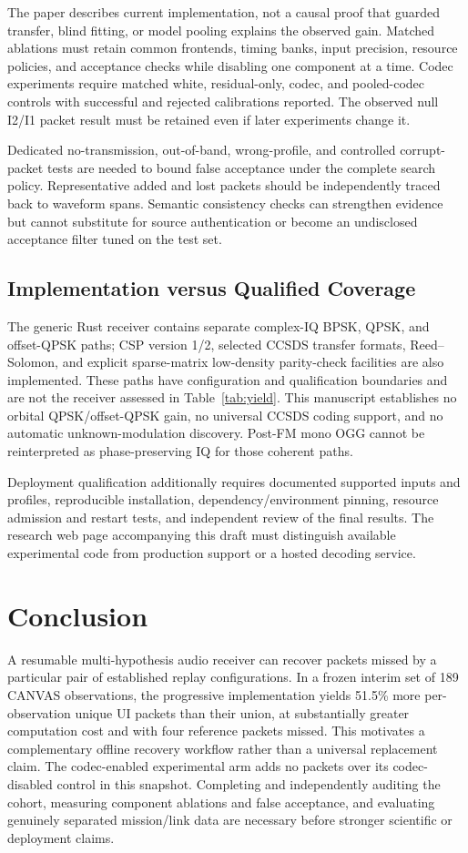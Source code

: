 \documentclass{ieeeaccess}
\begin{document}
The paper describes current implementation, not a causal proof that guarded transfer, blind fitting, or model pooling explains the observed gain. Matched ablations must retain common frontends, timing banks, input precision, resource policies, and acceptance checks while disabling one component at a time. Codec experiments require matched white, residual-only, codec, and pooled-codec controls with successful and rejected calibrations reported. The observed null I2/I1 packet result must be retained even if later experiments change it.

Dedicated no-transmission, out-of-band, wrong-profile, and controlled corrupt-packet tests are needed to bound false acceptance under the complete search policy. Representative added and lost packets should be independently traced back to waveform spans. Semantic consistency checks can strengthen evidence but cannot substitute for source authentication or become an undisclosed acceptance filter tuned on the test set.

\subsection{Implementation versus Qualified Coverage}
The generic Rust receiver contains separate complex-IQ BPSK, QPSK, and offset-QPSK paths; CSP version 1/2, selected CCSDS transfer formats, Reed--Solomon, and explicit sparse-matrix low-density parity-check facilities are also implemented. These paths have configuration and qualification boundaries and are not the receiver assessed in Table~\ref{tab:yield}. This manuscript establishes no orbital QPSK/offset-QPSK gain, no universal CCSDS coding support, and no automatic unknown-modulation discovery. Post-FM mono OGG cannot be reinterpreted as phase-preserving IQ for those coherent paths.

Deployment qualification additionally requires documented supported inputs and profiles, reproducible installation, dependency/environment pinning, resource admission and restart tests, and independent review of the final results. The research web page accompanying this draft must distinguish available experimental code from production support or a hosted decoding service.

\section{Conclusion}
A resumable multi-hypothesis audio receiver can recover packets missed by a particular pair of established replay configurations. In a frozen interim set of 189 CANVAS observations, the progressive implementation yields 51.5\% more per-observation unique UI packets than their union, at substantially greater computation cost and with four reference packets missed. This motivates a complementary offline recovery workflow rather than a universal replacement claim. The codec-enabled experimental arm adds no packets over its codec-disabled control in this snapshot. Completing and independently auditing the cohort, measuring component ablations and false acceptance, and evaluating genuinely separated mission/link data are necessary before stronger scientific or deployment claims.
\end{document}
